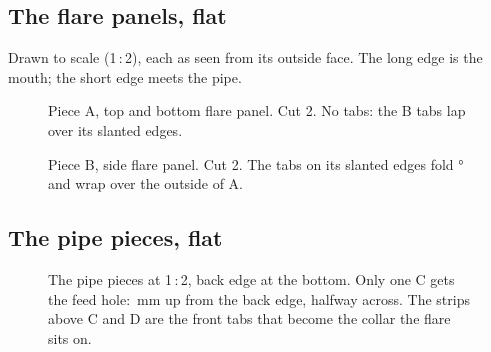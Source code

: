 \documentclass[10pt]{article}
\begin{document}
\newpage
\subsection{The flare panels, flat}
Drawn to scale (1\,:\,2), each as seen from its outside face. The long edge is the mouth; the short edge meets the pipe.

\begin{figure}[H]
\centering

\caption{Piece A, top and bottom flare panel. Cut 2. No tabs: the B tabs lap over its slanted edges.}
\end{figure}
\begin{figure}[H]
\centering

\caption{Piece B, side flare panel. Cut 2. The tabs on its slanted edges fold \cornerBend° and wrap over the outside of A.}
\end{figure}

\newpage
\subsection{The pipe pieces, flat}
\begin{figure}[H]
\centering

\caption{The pipe pieces at 1\,:\,2, back edge at the bottom. Only one C gets the feed hole: \probeZ\,mm up from the back edge, halfway across. The strips above C and D are the front tabs that become the collar the flare sits on.}
\end{figure}
\end{document}
